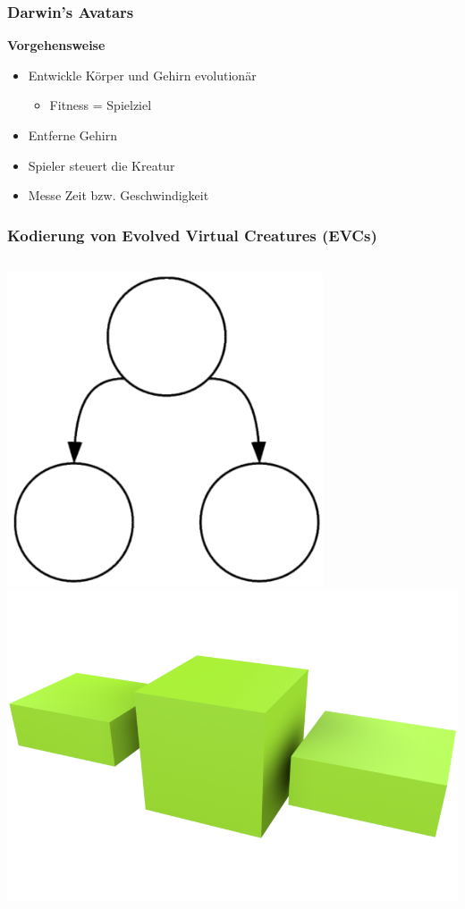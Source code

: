 \documentclass{beamer}
\begin{document}
\begin{frame}
	\frametitle{Darwin's Avatars}
	\textbf{Vorgehensweise}\\ \pause
	\begin{itemize}
		\item Entwickle Körper und Gehirn evolutionär \pause
		\begin{itemize}
			\item Fitness = Spielziel \pause
		\end{itemize} 
		\item Entferne Gehirn \pause
		\item Spieler steuert die Kreatur \pause
		\item Messe Zeit bzw. Geschwindigkeit
	\end{itemize}	
\end{frame}

\begin{frame}
	\frametitle{Kodierung von Evolved Virtual Creatures (EVCs)}
	\begin{columns}[c]
		\centering
		\includegraphics[width=0.7\textwidth]{img/g1.png} \pause
		\centering
		\includegraphics[width=\textwidth]{img/1.png}
	\end{columns}
\end{frame}
\end{document}
